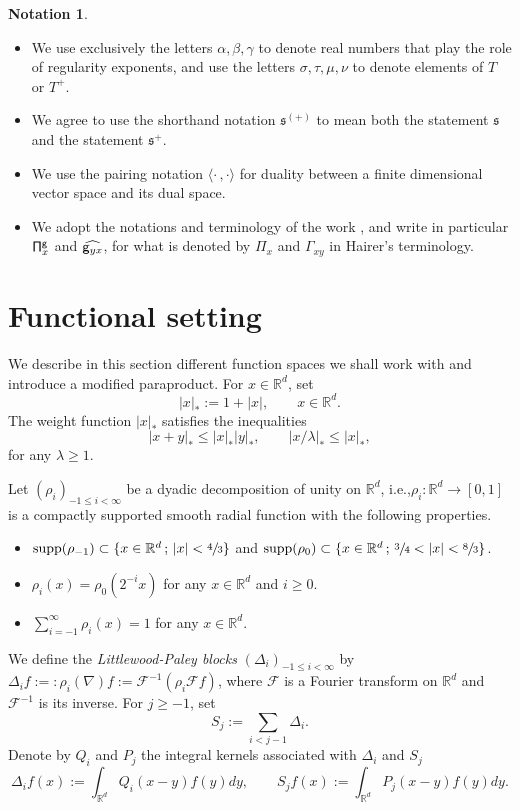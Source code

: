 \documentclass[11pt]{article}
\newcommand{\ie}{i.e.,\xspace}
\newcommand{\skpt}{\smallskip}
\numberwithin{equation}{section}
\DeclareMathOperator{\supp}{supp}
\theoremstyle{plain}
\theoremstyle{definition}
\newtheorem*{notation*} {Notation}
\newcommand{\frks}{\mathfrak{s}}
\newcommand{\bbR}{\mathbb{R}}
\newcommand{\mcF}{\mathcal{F}}
\begin{document}
\skpt
\begin{notation*}
\begin{itemize}
\item
We use exclusively the letters $\alpha, \beta, \gamma$ to denote real numbers that play the role of regularity exponents, and use the letters $\sigma, \tau, \mu, \nu$ to denote elements of $T$ or $T^+$.

\item
We agree to use the shorthand notation $\frks^{(+)}$ to mean both the statement $\frks$ and the statement $\frks^+$.

\item
We use the pairing notation $\langle \cdot\,,\cdot\rangle$ for duality between a finite dimensional vector space and its dual space.

\item
We adopt the notations and terminology of the work \cite{BH}, and write in particular ${\sf \Pi}^{\sf g}_x$ and $\widehat{{\sf g}_{yx}}$, for what is denoted by $\Pi_x$ and $\Gamma_{xy}$ in Hairer's terminology.
\end{itemize}
\end{notation*}

\section{Functional setting}
\label{SectionFunctionalSetting}

We describe in this section different function spaces we shall work with and introduce a modified paraproduct. For $x\in\bbR^d$, set\vspace*{-3pt}
\[
|x|_* := 1+|x|,\qquad x\in\bbR^d.
\]
The weight function $|x|_*$ satisfies the inequalities
\[
|x+y|_*\le|x|_*|y|_*, \qquad |x/\lambda|_*\le|x|_*,
\]
for any $\lambda\ge1$.

Let $(\rho_i)_{-1\leq i<\infty}$ be a dyadic decomposition of unity on $\bbR^d$, \ie $\rho_i:\bbR^d\to[0,1]$ is a compactly supported smooth radial function with the following properties.
\begin{itemize}
\item $\supp (\rho_{-1})\subset\{x\in\bbR^d\,;\,|x|<\sfrac43\}$ and $\supp (\rho_0)\subset\{x\in\bbR^d\,;\,\sfrac34<|x|<\sfrac83\}$.
\item $\rho_i(x)=\rho_0(2^{-i}x)$ for any $x\in\bbR^d$ and $i\ge0$.
\item $\sum_{i=-1}^\infty\rho_i(x)=1$ for any $x\in\bbR^d$.
\end{itemize}
We define the \emph{Littlewood-Paley blocks} $(\Delta_i)_{-1\leq i<\infty}$ by $\Delta_if :=: \rho_i(\nabla)f:= \mcF^{-1}(\rho_i\mcF f)$, where $\mcF$ is a Fourier transform on $\bbR^d$ and $\mcF^{-1}$ is its inverse. For $j\geq -1$, set
\[
S_j := \sum_{i<j-1}\Delta_i.
\]
Denote by $Q_i$ and $P_j$ the integral kernels associated with $\Delta_i$ and $S_j$
\[
\Delta_if(x) := \int_{\bbR^d} Q_i(x-y)f(y)dy, \qquad S_jf(x) := \int_{\bbR^d} P_j(x-y)f(y)dy.
\]
\end{document}
